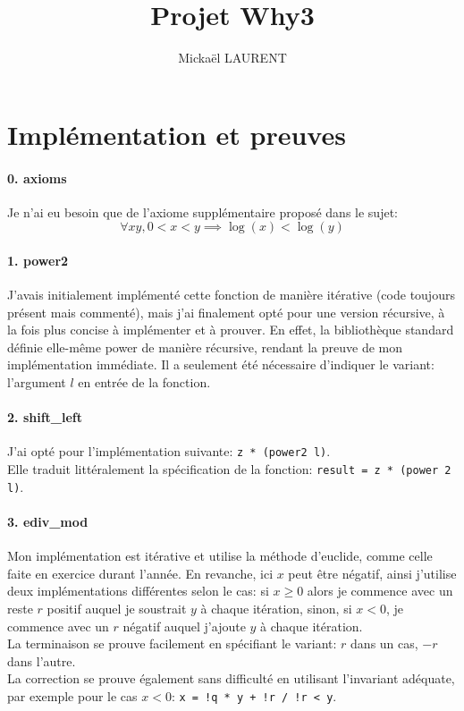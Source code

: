 \documentclass[a4paper]{article}%
\title{\vspace{1.5cm}Projet Why3}
\author{Mickaël LAURENT}
\date{\vspace{-5ex}}
\begin{document}
	\maketitle

	\section{Implémentation et preuves}

	\paragraph{0. axioms}
	Je n'ai eu besoin que de l'axiome supplémentaire proposé dans le sujet:
	\[\forall xy, 0 < x < y \implies \log(x) < \log(y)\]

	\paragraph{1. power2}
	J'avais initialement implémenté cette fonction de manière itérative (code toujours présent mais commenté),
	mais j'ai finalement opté pour une version récursive, à la fois plus concise à implémenter et à prouver.
	En effet, la bibliothèque standard définie elle-même power de manière récursive, rendant la preuve de mon implémentation immédiate.
	Il a seulement été nécessaire d'indiquer le variant: l'argument $l$ en entrée de la fonction.

	\paragraph{2. shift\_left}
	J'ai opté pour l'implémentation suivante:  \texttt{z * (power2 l)}.\\
	Elle traduit littéralement la spécification de la fonction: \texttt{result = z * (power 2 l)}.

	\paragraph{3. ediv\_mod}
	Mon implémentation est itérative et utilise la méthode d'euclide, comme celle faite en exercice durant l'année.
	En revanche, ici $x$ peut être négatif, ainsi j'utilise deux implémentations différentes selon le cas:
	si $x \geq 0$ alors je commence avec un reste $r$ positif auquel je soustrait $y$ à chaque itération, sinon, si $x < 0$,
	je commence avec un $r$ négatif auquel j'ajoute $y$ à chaque itération.\\
	La terminaison se prouve facilement en spécifiant le variant: $r$ dans un cas, $-r$ dans l'autre.\\
	La correction se prouve également sans difficulté en utilisant l'invariant adéquate, par exemple pour le cas $x < 0$:
	\texttt{x = !q * y + !r /\ !r < y}.
\end{document}
